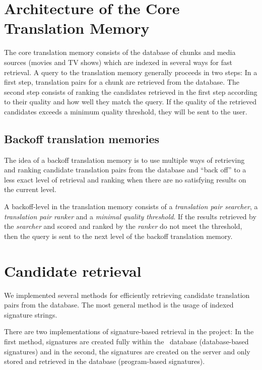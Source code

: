 \section{Architecture of the Core Translation Memory}

The core translation memory consists of the database of chunks and media
sources (movies and TV shows) which are indexed in several ways for fast
retrieval. A query to the translation memory generally proceeds in two
steps: In a first step, translation pairs for a chunk are retrieved from
the database. The second step consists of ranking the candidates
retrieved in the first step according to their quality and how well they
match the query. If the quality of the retrieved candidates exceeds a
minimum quality threshold, they will be sent to the user.

\subsection{Backoff translation memories}

The idea of a backoff translation memory is to use multiple ways of
retrieving and ranking candidate translation pairs from the database and
``back off'' to a less exact level of retrieval and ranking when there
are no satisfying results on the current level.

A backoff-level in the translation memory consists of a \emph{translation pair
searcher}, a \emph{translation pair ranker} and a \emph{minimal quality
threshold}. 
If the results retrieved by the \emph{searcher} and scored and ranked by
the \emph{ranker} do not meet the threshold, then the query is sent to the 
next level of the backoff translation memory. 


\section{Candidate retrieval}
\label{sec:candidate_retrieval}

We implemented several methods for efficiently retrieving candidate
translation pairs from the database. The most general method
is the usage of indexed signature strings.

There are two implementations of signature-based retrieval in the project: In the first method, signatures are created fully within the \postgres~database (database-based signatures) and in the second, the signatures are created on the server and only stored and retrieved in the
database (program-based signatures).  



